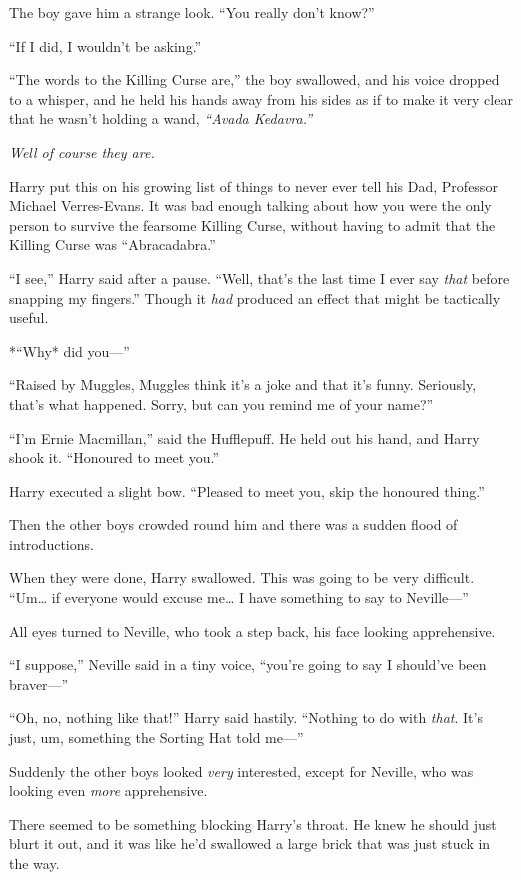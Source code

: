The boy gave him a strange look. ``You really don't know?''

``If I did, I wouldn't be asking.''

``The words to the Killing Curse are,'' the boy swallowed, and his voice
dropped to a whisper, and he held his hands away from his sides as if to
make it very clear that he wasn't holding a wand, \emph{``Avada
Kedavra.''}

\emph{Well of course they are.}

Harry put this on his growing list of things to never ever tell his Dad,
Professor Michael Verres-Evans. It was bad enough talking about how you
were the only person to survive the fearsome Killing Curse, without
having to admit that the Killing Curse was ``Abracadabra.''

``I see,'' Harry said after a pause. ``Well, that's the last time I ever
say \emph{that} before snapping my fingers.'' Though it \emph{had}
produced an effect that might be tactically useful.

*``Why* did you---''

``Raised by Muggles, Muggles think it's a joke and that it's funny.
Seriously, that's what happened. Sorry, but can you remind me of your
name?''

``I'm Ernie Macmillan,'' said the Hufflepuff. He held out his hand, and
Harry shook it. ``Honoured to meet you.''

Harry executed a slight bow. ``Pleased to meet you, skip the honoured
thing.''

Then the other boys crowded round him and there was a sudden flood of
introductions.

When they were done, Harry swallowed. This was going to be very
difficult. ``Um\ldots{} if everyone would excuse me\ldots{} I have
something to say to Neville---''

All eyes turned to Neville, who took a step back, his face looking
apprehensive.

``I suppose,'' Neville said in a tiny voice, ``you're going to say I
should've been braver---''

``Oh, no, nothing like that!'' Harry said hastily. ``Nothing to do with
\emph{that}. It's just, um, something the Sorting Hat told me---''

Suddenly the other boys looked \emph{very} interested, except for
Neville, who was looking even \emph{more} apprehensive.

There seemed to be something blocking Harry's throat. He knew he should
just blurt it out, and it was like he'd swallowed a large brick that was
just stuck in the way.

